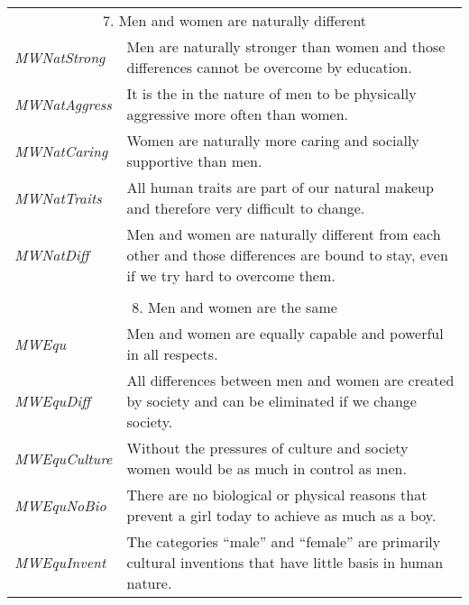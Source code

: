 \documentclass[fignum,man]{apa}\usepackage[]{graphicx}\usepackage[]{color}
\begin{document}
\begin{longtable}{p{.2\linewidth} p{.8\linewidth}}
	\\
\hline
\multicolumn{2}{c}{7. Men and women are naturally different}\\
\nopagebreak
\hline
\nopagebreak
\emph{MWNatStrong} & Men are naturally stronger than women and those differences cannot be overcome by education.\\
\emph{MWNatAggress} & It is the in the nature of men to be physically aggressive more often than women.\\
\emph{MWNatCaring} & Women are naturally more caring and socially supportive than men.\\
\emph{MWNatTraits} & All human traits are part of our natural makeup and therefore very difficult to change.\\
\emph{MWNatDiff} & Men and women are naturally different from each other and those differences are bound to stay, even if we try hard to overcome them.\\

	\\
\hline
\multicolumn{2}{c}{8. Men and women are the same}\\
\nopagebreak
\hline
\nopagebreak
\emph{MWEqu} & Men and women are equally capable and powerful in all respects.\\
\emph{MWEquDiff} & All differences between men and women are created by society and can be eliminated if we change society.\\
\emph{MWEquCulture} & Without the pressures of culture and society women would be as much in control as men.\\
\emph{MWEquNoBio} & There are no biological or physical reasons that prevent a girl today to achieve as much as a boy.\\
\emph{MWEquInvent} & The categories ``male'' and ``female'' are primarily cultural inventions that have little basis in human nature.\\
\hline
	
\end{longtable}
\end{document}
